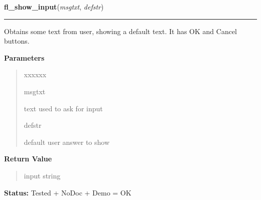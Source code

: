     \label{xformslib:library:fl_show_input}

    \vspace{0.5ex}

\hspace{.8\funcindent}\begin{boxedminipage}{\funcwidth}

    \raggedright \textbf{fl\_show\_input}(\textit{msgtxt}, \textit{defstr})

    \vspace{-1.5ex}

    \rule{\textwidth}{0.5\fboxrule}
\setlength{\parskip}{2ex}
    Obtains some text from user, showing a default text. It has OK and 
    Cancel buttons.

\setlength{\parskip}{1ex}
      \textbf{Parameters}
      \vspace{-1ex}

      \begin{quote}
        \begin{Ventry}{xxxxxx}

          \item[msgtxt]

          text used to ask for input

          \item[defstr]

          default user answer to show

        \end{Ventry}

      \end{quote}

      \textbf{Return Value}
    \vspace{-1ex}

      \begin{quote}
      input string

      \end{quote}

\textbf{Status:} Tested + NoDoc + Demo = OK



    \end{boxedminipage}

    \label{xformslib:library:fl_hide_input}

    \vspace{0.5ex}

